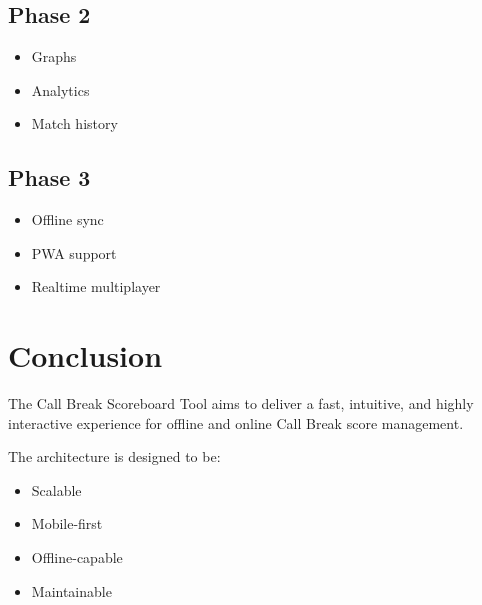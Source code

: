 \documentclass[11pt,a4paper]{article}
\begin{document}
\subsection{Phase 2}
\begin{itemize}
    \item Graphs
    \item Analytics
    \item Match history
\end{itemize}

\subsection{Phase 3}
\begin{itemize}
    \item Offline sync
    \item PWA support
    \item Realtime multiplayer
\end{itemize}

\section{Conclusion}

The Call Break Scoreboard Tool aims to deliver a fast, intuitive, and highly interactive experience for offline and online Call Break score management.

The architecture is designed to be:
\begin{itemize}
    \item Scalable
    \item Mobile-first
    \item Offline-capable
    \item Maintainable
\end{itemize}
\end{document}
